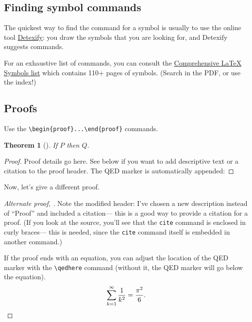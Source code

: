 \documentclass[11pt]{amsart}
\newtheorem{thm}{Theorem}[section] %
\theoremstyle{definition}                  %
\theoremstyle{remark}                       %
\numberwithin{equation}{section}
\begin{document}
\subsection{Finding symbol commands}

The quickest way to find the command for a symbol is usually to use the online tool \href{http://detexify.kirelabs.org/classify.html}{Detexify}: you draw the symbols that you are looking for, and Detexify suggests commands.

For an exhaustive list of commands, you can consult the \href{http://www.ctan.org/tex-archive/info/symbols/comprehensive/symbols-letter.pdf}{Comprehensive LaTeX Symbols list}
which contains 110+ pages of symbols. (Search in the PDF, or use the index!)

\subsection{Proofs}
Use the \verb+\begin{proof}...\end{proof}+ commands.

\begin{thm}[{\cite[Theorem A]{cg}}]  %
If $P$ then $Q$. \label{thm:citation in header}
\end{thm}

\begin{proof}
Proof details go here. See below if you want to add descriptive text or a citation to the proof header. The QED marker is automatically appended:
\end{proof}

Now, let's give a different proof. 
\begin{proof}[Alternate proof, {\cite[\S 3]{cg}}]
Note the modified header: I've chosen a new description instead of ``Proof'' and included a citation---  this is a good way to provide a citation for a proof. 
(If you look at the source, you'll see that the \texttt{cite} command is enclosed in curly braces--- this is needed,  since the \texttt{cite} command  itself is embedded in another command.)

If the proof ends with an equation, you can adjust the location of the QED marker with the \verb+\qedhere+ command (without it, the QED marker will go below the equation). 
\begin{equation}
\sum_{k=1}^\infty \frac{1}{k^2}  = \frac{\pi^2}{6}. \qedhere
\end{equation}
\end{proof}
\end{document}
